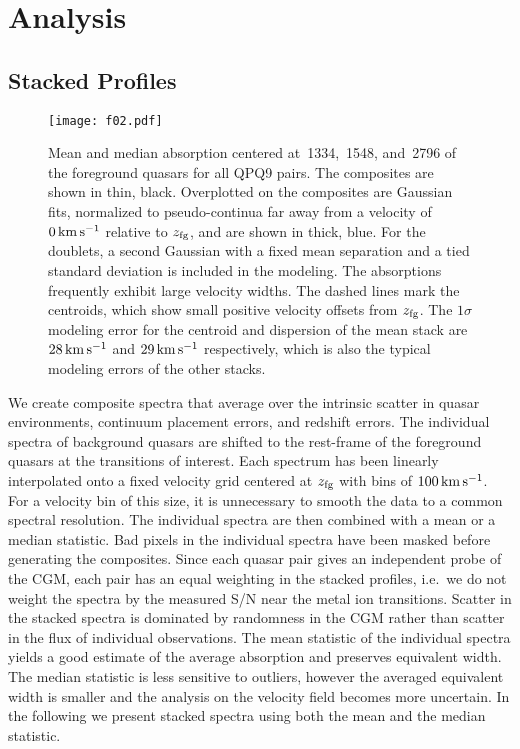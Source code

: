 \documentclass[iop]{emulateapj}
\begin{document}
\section{Analysis}
\label{sec:analysis}

\subsection{Stacked Profiles}
\label{sec:stacks}

\begin{figure}
\texttt{[image: f02.pdf]}
\caption{Mean and median absorption centered at \,1334, \,1548, and 
\,2796 of the foreground quasars for all QPQ9 pairs. The composites are shown in thin, 
black. Overplotted on the composites are Gaussian fits, normalized to pseudo-continua far away 
from a velocity of $0\,{\rm km\,s^{-1}}$ relative to $z_{\rm fg}$, and are shown in thick, blue. 
For the doublets, a second Gaussian with a fixed mean separation and a tied standard deviation is 
included in the modeling. The absorptions frequently exhibit large velocity widths. The dashed 
lines mark the centroids, which show small positive velocity offsets from $z_{\rm fg}$. The 
$1\sigma$ modeling error for the centroid and dispersion of the  mean stack are 
$28\,{\rm km\,s^{-1}}$ and $29\,{\rm km\,s^{-1}}$ respectively, which is also the typical modeling 
errors of the other stacks.
}
\label{fig:stacks_and_fits}
\end{figure}

We create composite spectra that average over the intrinsic scatter in quasar environments, 
continuum placement errors, and redshift errors. The individual spectra of background quasars are 
shifted to the rest-frame of the foreground quasars at the transitions of interest. Each spectrum 
has been linearly interpolated onto a fixed velocity grid centered at $z_{\rm fg}$ with bins of 
$100\,{\rm km\,s^{-1}}$. For a velocity bin of this size, it is unnecessary to smooth the data to 
a common spectral resolution. The individual spectra are then combined with a mean or a median 
statistic. Bad pixels in the individual spectra have been masked before generating the 
composites. Since each quasar pair gives an independent probe of the CGM, each pair has an equal 
weighting in the stacked profiles, i.e.\ we do not weight the spectra by the measured S/N near the 
metal ion transitions. Scatter in the stacked spectra is dominated by randomness in the CGM rather 
than scatter in the flux of individual observations. The mean statistic of the individual spectra 
yields a good estimate of the average absorption and preserves equivalent width. The median 
statistic is less sensitive to outliers, however the averaged equivalent width is smaller and the 
analysis on the velocity field becomes more uncertain. In the following we present stacked spectra 
using both the mean and the median statistic. 
\end{document}
